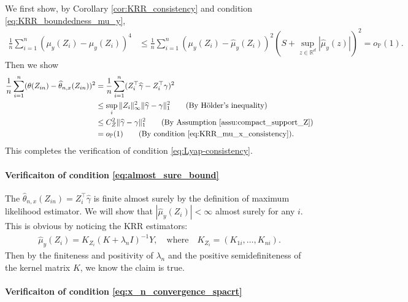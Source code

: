 \documentclass[12pt]{article}
\theoremstyle{definition}
\def\P{\mathbb{P}}
\def\P{\mathbb{P}}
\renewcommand{\P}{\mathbb{P}}							%
\newcommand{\srz}{Z}									%
\begin{document}
We first show, by Corollary \ref{cor:KRR_consistency} and condition \eqref{eq:KRR_boundedness_mu_y},
\begin{align*}
  \frac{1}{n}\sum_{i=1}^n (\mu_{y}(\srz_i)-\widehat{\mu}_y(\srz_i))^4
  &
  \leq \frac{1}{n}\sum_{i=1}^n(\mu_{y}(\srz_i)-\widehat{\mu}_y(\srz_i))^2(S+\sup_{z\in\mathbb{R}^d}|\widehat{\mu}_y(z)|)^2=o_\P(1).
\end{align*}
Then we show
\begin{align*}
  \frac{1}{n}\sum_{i=1}^n (\theta(\srz_{in})-\widehat{\theta}_{n,x}(\srz_{in}))^2
  &
  =\frac{1}{n}\sum_{i=1}^n (\srz_i^\top\widehat{\gamma}-\srz_i^\top\gamma)^2\\
  &
  \leq \sup_i\|\srz_i\|_{\infty}^2\|\widehat{\gamma}-\gamma\|_1^2\tag{By H\"older's inequality}\\
  &
  \leq C_Z^2\|\widehat{\gamma}-\gamma\|_1^2\tag{By Assumption \ref{assu:compact_support_Z}}\\
  &
  =o_\P(1)\tag{By condition \eqref{eq:KRR_mu_x_consistency}}.
\end{align*}
This completes the verification of condition \eqref{eq:Lyap-consistency}.


\paragraph{Verificaiton of condition \eqref{eq:almost_sure_bound}}

The $\widehat{\theta}_{n,x}(\srz_{in})=\srz_i^\top\widehat{\gamma}$ is finite almost surely by the definition of maximum likelihood estimator. We will show that $|\widehat{\mu}_{y}(\srz_i)|<\infty$ almost surely for any $i$. This is obvious by noticing the KRR estimators:
\begin{align*}
  \widehat{\mu}_{y}(\srz_i)=K_{\srz_i}(K+\lambda_n I)^{-1}Y,\quad\text{where}\quad K_{Z_i}=(K_{1i},\ldots,K_{ni}).
\end{align*}
Then by the finiteness and positivity of $\lambda_n$ and the positive semidefiniteness of the kernel matrix $K$, we know the claim is true.

\paragraph{Verificaiton of condition \eqref{eq:x_n_convergence_spacrt}}
\end{document}
